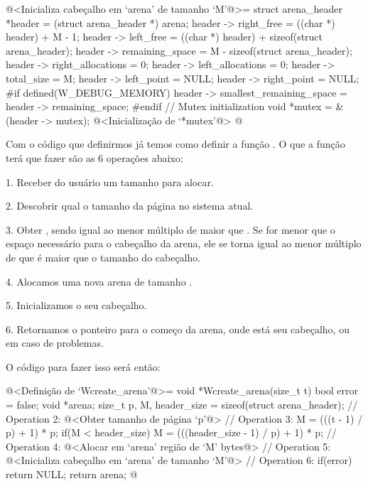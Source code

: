 \iniciocodigo
@<Inicializa cabeçalho em `arena' de tamanho `M'@>=
{
  struct arena_header *header = (struct arena_header *) arena;
  header -> right_free = ((char *) header) + M - 1;
  header -> left_free = ((char *) header) + sizeof(struct arena_header);
  header -> remaining_space = M - sizeof(struct arena_header);
  header -> right_allocations = 0;
  header -> left_allocations = 0;
  header -> total_size = M;
  header -> left_point = NULL;
  header -> right_point = NULL;
#if defined(W_DEBUG_MEMORY)
  header ->  smallest_remaining_space = header -> remaining_space;
#endif
  { // Mutex initialization
    void *mutex = &(header -> mutex);
    @<Inicialização de `*mutex'@>
  }
}
@
\fimcodigo


Com o código que definirmos já temos como definir a
função . O que a função terá que fazer
são as 6 operações abaixo:

1. Receber do usuário um tamanho  para alocar.

2. Descobrir qual o tamanho da página  no sistema atual.

3. Obter , sendo igual ao menor múltiplo
de  maior que . Se  for
menor que o espaço necessário para o cabeçalho da arena, ele se torna
igual ao menor múltiplo de  que é maior que o tamanho do
cabeçalho.

4. Alocamos uma nova arena de tamanho .

5. Inicializamos o seu cabeçalho.

6. Retornamos o ponteiro para o começo da arena, onde está seu cabeçalho,
ou  em caso de problemas.

O código para fazer isso será então:

\iniciocodigo
@<Definição de `Wcreate\_arena'@>=
void *Wcreate_arena(size_t t){
  bool error = false;
  void *arena;
  size_t p, M, header_size = sizeof(struct arena_header);
  // Operation 2:
  @<Obter tamanho de página `p'@>
  // Operation 3:
  M = (((t - 1) / p) + 1) * p;
  if(M < header_size)
    M = (((header_size - 1) / p) + 1) * p;
  // Operation 4:
  @<Alocar em `arena' região de `M' bytes@>
  // Operation 5:
  @<Inicializa cabeçalho em `arena' de tamanho `M'@>
  // Operation 6:
  if(error) return NULL;
  return arena;
}
@
\fimcodigo


